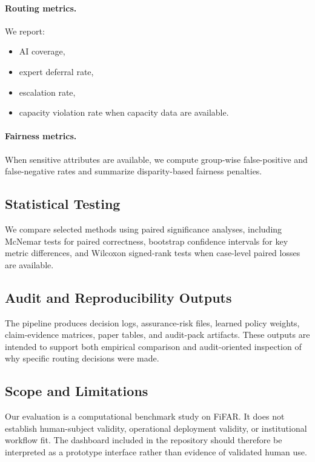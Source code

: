 \paragraph{Routing metrics.}
We report:
\begin{itemize}
\item AI coverage,
\item expert deferral rate,
\item escalation rate,
\item capacity violation rate when capacity data are available.
\end{itemize}

\paragraph{Fairness metrics.}
When sensitive attributes are available, we compute group-wise false-positive and false-negative rates and summarize disparity-based fairness penalties.

\subsection{Statistical Testing}
\label{subsec:stat_tests}

We compare selected methods using paired significance analyses, including McNemar tests for paired correctness, bootstrap confidence intervals for key metric differences, and Wilcoxon signed-rank tests when case-level paired losses are available.

\subsection{Audit and Reproducibility Outputs}
\label{subsec:audit_outputs}

The pipeline produces decision logs, assurance-risk files, learned policy weights, claim-evidence matrices, paper tables, and audit-pack artifacts. These outputs are intended to support both empirical comparison and audit-oriented inspection of why specific routing decisions were made.

\subsection{Scope and Limitations}
\label{subsec:scope_limitations}

Our evaluation is a computational benchmark study on FiFAR. It does not establish human-subject validity, operational deployment validity, or institutional workflow fit. The dashboard included in the repository should therefore be interpreted as a prototype interface rather than evidence of validated human use.
